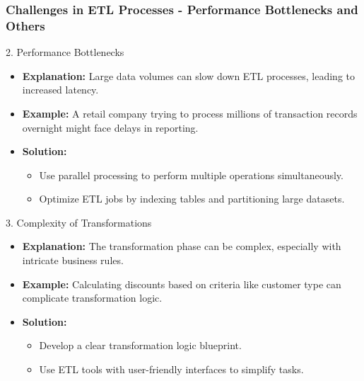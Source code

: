 \documentclass[aspectratio=169]{beamer}
\begin{document}
\begin{frame}[fragile]
    \frametitle{Challenges in ETL Processes - Performance Bottlenecks and Others}
    \begin{block}{2. Performance Bottlenecks}
        \begin{itemize}
            \item \textbf{Explanation:} Large data volumes can slow down ETL processes, leading to increased latency.
            \item \textbf{Example:} A retail company trying to process millions of transaction records overnight might face delays in reporting.
            \item \textbf{Solution:}
            \begin{itemize}
                \item Use parallel processing to perform multiple operations simultaneously.
                \item Optimize ETL jobs by indexing tables and partitioning large datasets.
            \end{itemize}
        \end{itemize}
    \end{block}

    \begin{block}{3. Complexity of Transformations}
        \begin{itemize}
            \item \textbf{Explanation:} The transformation phase can be complex, especially with intricate business rules.
            \item \textbf{Example:} Calculating discounts based on criteria like customer type can complicate transformation logic.
            \item \textbf{Solution:}
            \begin{itemize}
                \item Develop a clear transformation logic blueprint.
                \item Use ETL tools with user-friendly interfaces to simplify tasks.
            \end{itemize}
        \end{itemize}
    \end{block} 
\end{frame}
\end{document}
